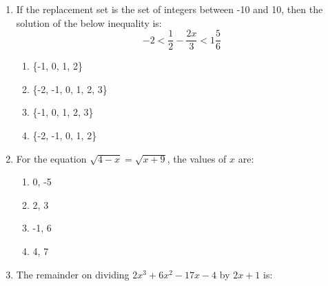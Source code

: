 \begin{enumerate}[label=(\roman*)]
        \begin{multicols}{2}
        \begin{enumerate}[label=(\alph*)]
            \item $-1 \leq x < 5, x \in \mathbb{R}$
            \item $-1 < x \leq 5, x \in \mathbb{R}$
            \item $-1 \leq x \leq 5, x \in \mathbb{R}$
            \item $-1 < x < 5, x \in \mathbb{R}$
        \end{enumerate}
        \end{multicols}

    \item If the replacement set is the set of integers between -10 and 10,
          then the solution of the below inequality is:
          \[ -2 < \frac12 - \frac{2x}{3} < 1\frac56 \] 

        \begin{multicols}{2}
        \begin{enumerate}[label=(\alph*)]
            \item \{-1, 0, 1, 2\}
            \item \{-2, -1, 0, 1, 2, 3\}
            \item \{-1, 0, 1, 2, 3\}
            \item \{-2, -1, 0, 1, 2\}
        \end{enumerate}
        \end{multicols}

    \item For the equation $\sqrt{4-x} = \sqrt{x+9}$, the values of $x$ are:

        \begin{multicols}{2}
        \begin{enumerate}[label=(\alph*)]
            \item 0, -5
            \item 2, 3
            \item -1, 6
            \item 4, 7
        \end{enumerate}
        \end{multicols}

    \item The remainder on dividing $2x^3 + 6x^2 - 17x -4$ by $2x+1$ is: 


\end{enumerate}
